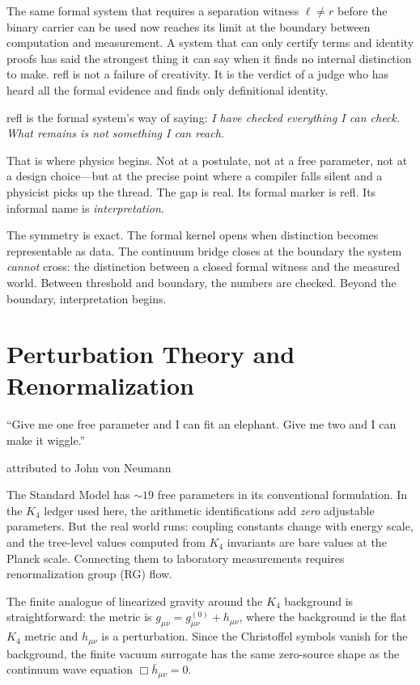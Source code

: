 \documentclass[11pt,a4paper]{book}
\def\texttt#1{#1}%
\begin{document}
The same formal system that requires a separation witness $\ell \neq r$ before the binary carrier can be used now reaches its limit at the boundary between computation and measurement. A system that can only certify terms and identity proofs has said the strongest thing it can say when it finds no internal distinction to make. \texttt{refl} is not a failure of creativity. It is the verdict of a judge who has heard all the formal evidence and finds only definitional identity.

\texttt{refl} is the formal system's way of saying: \emph{I have checked everything I can check. What remains is not something I can reach.}

That is where physics begins. Not at a postulate, not at a free parameter, not at a design choice---but at the precise point where a compiler falls silent and a physicist picks up the thread. The gap is real. Its formal marker is \texttt{refl}. Its informal name is \emph{interpretation}.

The symmetry is exact. The formal kernel opens when distinction becomes representable as data. The continuum bridge closes at the boundary the system \emph{cannot} cross: the distinction between a closed formal witness and the measured world. Between threshold and boundary, the numbers are checked. Beyond the boundary, interpretation begins.

\chapter{Perturbation Theory and Renormalization}
\label{ch:perturbation-rg}

\epigraph{``Give me one free parameter and I can fit an elephant. Give me two and I can make it wiggle.''}{attributed to John von Neumann}

The Standard Model has $\sim 19$ free parameters in its conventional formulation. In the $K_4$ ledger used here, the arithmetic identifications add \emph{zero} adjustable parameters. But the real world runs: coupling constants change with energy scale, and the tree-level values computed from $K_4$ invariants are bare values at the Planck scale. Connecting them to laboratory measurements requires renormalization group (RG) flow.

The finite analogue of linearized gravity around the $K_4$ background is straightforward: the metric is $g_{\mu\nu} = g^{(0)}_{\mu\nu} + h_{\mu\nu}$, where the background is the flat $K_4$ metric and $h_{\mu\nu}$ is a perturbation. Since the Christoffel symbols vanish for the background, the finite vacuum surrogate has the same zero-source shape as the continuum wave equation $\Box \bar{h}_{\mu\nu} = 0$.
\end{document}
